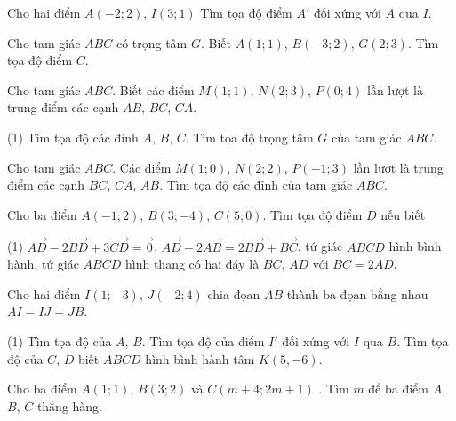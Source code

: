 \begin{vd}
	Cho hai điểm $A(-2;2)$, $I(3;1)$ Tìm tọa độ điểm $A'$ đối xứng với $A$ qua $I$.
\end{vd}

\begin{vd}
	Cho tam giác $ABC$ có trọng tâm $G$. Biết $A(1;1)$, $B(-3;2)$, $G(2;3)$. Tìm tọa độ điểm $C$.
\end{vd}

\begin{vd}
	Cho tam giác $ABC$. Biết các điểm $M(1;1)$, $N(2;3)$, $P(0;4)$ lần lượt là trung điểm các cạnh $AB$, $BC$, $CA$.
	\begin{tasks}(1)
		\task Tìm tọa độ các đỉnh $A$, $B$, $C$.
		\task Tìm tọa độ trọng tâm $G$ của tam giác $ABC$.
	\end{tasks}
\end{vd}

\begin{vd}
	Cho tam giác $ABC$. Các điểm $M(1; 0)$, $N(2; 2)$, $P(-1; 3)$ lần lượt là trung điểm các cạnh $BC$, $CA$, $AB$. Tìm tọa độ các đỉnh của tam giác $ABC$.
\end{vd}
\begin{vd}
	Cho ba điểm $A(-1; 2)$, $B (3; -4)$, $C(5; 0)$. Tìm tọa độ điểm $D$ nếu biết
	\begin{tasks}(1)
		\task $\overrightarrow{AD}-2\overrightarrow{BD}+3\overrightarrow{CD}=\overrightarrow{0}$.
		\task $\overrightarrow{AD}-2\overrightarrow{AB}=2\overrightarrow{BD}+\overrightarrow{BC}$.
		\task tứ giác $ABCD$ hình bình hành.
		\task tứ giác $ABCD$ hình thang có hai đáy là $BC$, $AD$ với $BC = 2AD$.
	\end{tasks}
\end{vd}

\begin{vd}
	Cho hai điểm $I(1; -3)$, $J(-2; 4)$ chia đọan $AB$ thành ba đọan bằng nhau $AI = IJ = JB$.
	\begin{tasks}(1)
		\task Tìm tọa độ của $A$, $B$.
		\task Tìm tọa độ của điểm $I'$ đối xứng với $I$ qua $B$.
		\task Tìm tọa độ của $C$, $D$ biết $ABCD$ hình bình hành tâm $K(5, -6)$.
	\end{tasks}
\end{vd}

\begin{vd}
	Cho ba điểm $A\left( 1;1 \right)$, $B\left( 3;2 \right)$ và $C\left( m+4;2m+1 \right)$ . Tìm $m$ để ba điểm $A$, $B$, $C$ thẳng hàng.
\end{vd}


